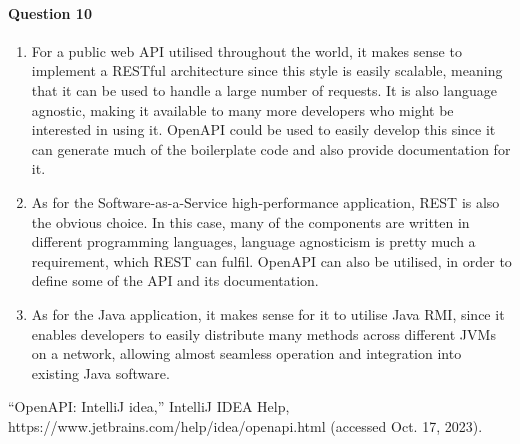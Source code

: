 \documentclass{ds-report}
\begin{document}
    \paragraph{Question 10}
    \renewcommand{\labelenumi}{\alph{enumi}}
    \begin{enumerate}
        \item For a public web API utilised throughout the world, it makes sense to implement a RESTful architecture since this style is easily scalable, meaning that it can be used to handle a large number of requests. It is also language agnostic, making it available to many more developers who might be interested in using it. OpenAPI could be used to easily develop this since it can generate much of the boilerplate code and also provide documentation for it.
        
        \item As for the Software-as-a-Service high-performance application, REST is also the obvious choice. In this case, many of the components are written in different programming languages, language agnosticism is pretty much a requirement, which REST can fulfil. OpenAPI can also be utilised, in order to define some of the API and its documentation.
        
        \item As for the Java application, it makes sense for it to utilise Java RMI, since it enables developers to easily distribute many methods across different JVMs on a network, allowing almost seamless operation and integration into existing Java software. 
    \end{enumerate}

	\clearpage
	

\begin{thebibliography}{9}
    “OpenAPI: IntelliJ idea,” IntelliJ IDEA Help, https://www.jetbrains.com/help/idea/openapi.html (accessed Oct. 17, 2023). 

\end{thebibliography}
 
	
\end{document}
